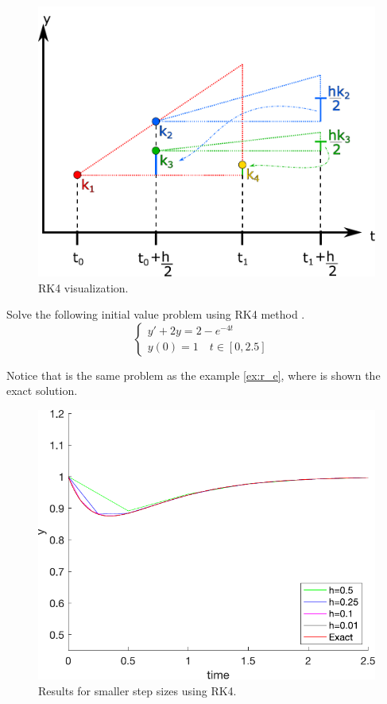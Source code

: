 \begin{figure}[H]
    \centering
    \includegraphics[scale=0.4]{files/sv.pdf}
    \caption{RK4 visualization.}
    \label{fig:RK4Visual}
\end{figure}


\begin{exmp}
Solve the following initial value problem using RK4 method \cite{exampleeuler}.
\begin{equation}
\begin{cases}
    y'+2y=2-e^{-4t}&\\ y(0)=1\quad t\in[0,2.5]& 
\end{cases}
\end{equation}
\end{exmp}
Notice that is the same  problem as the example \ref{ex:r_e}, where is shown the exact solution.
\begin{figure}[H]
    \centering
    \includegraphics[scale=0.5]{files/exampleKutta.pdf}
    \caption{Results for smaller step sizes using RK4.}
    \label{fig:exkutta}
\end{figure}

